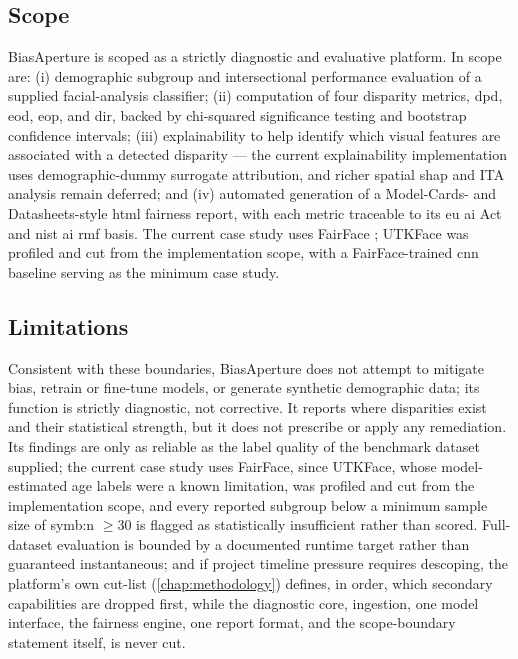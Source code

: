 \subsection{Scope}
BiasAperture is scoped as a strictly diagnostic and evaluative platform. In scope are: (i) demographic subgroup and intersectional performance evaluation of a supplied facial-analysis classifier; (ii) computation of four disparity metrics, \gls{dpd}, \gls{eod}, \gls{eop}, and \gls{dir}, backed by chi-squared significance testing and bootstrap confidence intervals; (iii) explainability to help identify which visual features are associated with a detected disparity --- the current explainability implementation uses demographic-dummy surrogate attribution, and richer spatial \gls{shap} and ITA analysis remain deferred; and (iv) automated generation of a Model-Cards- and Datasheets-style \gls{html} fairness report, with each metric traceable to its \gls{eu} \gls{ai} Act and \gls{nist} \gls{ai} \gls{rmf} basis. The current case study uses FairFace \cite{karkkainen2021fairface}; UTKFace was profiled and cut from the implementation scope, with a FairFace-trained \gls{cnn} baseline serving as the minimum case study.

\subsection{Limitations}
Consistent with these boundaries, BiasAperture does not attempt to mitigate bias, retrain or fine-tune models, or generate synthetic demographic data; its function is strictly diagnostic, not corrective. It reports where disparities exist and their statistical strength, but it does not prescribe or apply any remediation. Its findings are only as reliable as the label quality of the benchmark dataset supplied; the current case study uses FairFace, since UTKFace, whose model-estimated age labels were a known limitation, was profiled and cut from the implementation scope, and every reported subgroup below a minimum sample size of \gls{symb:n} \(\geq 30\) is flagged as statistically insufficient rather than scored. Full-dataset evaluation is bounded by a documented runtime target rather than guaranteed instantaneous; and if project timeline pressure requires descoping, the platform's own cut-list (\cref{chap:methodology}) defines, in order, which secondary capabilities are dropped first, while the diagnostic core, ingestion, one model interface, the fairness engine, one report format, and the scope-boundary statement itself, is never cut.
